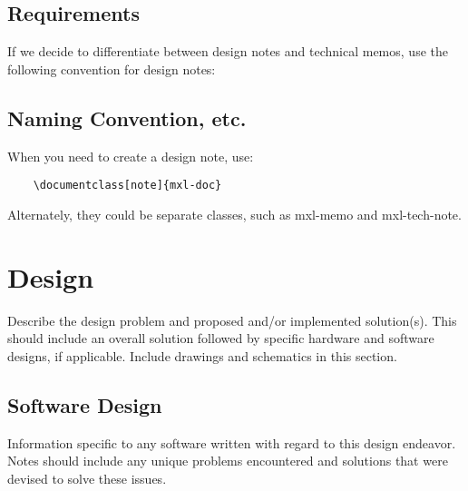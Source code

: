 \documentclass{mxl-design}
\begin{document}

\subsection{Requirements}
If we decide to differentiate between design notes and technical memos, use the following convention for design notes:

\subsection{Naming Convention, etc.}
When you need to create a design note, use:

\begin{verbatim}
	\documentclass[note]{mxl-doc}
\end{verbatim}

Alternately, they could be separate classes, such as mxl-memo and mxl-tech-note.

\section{Design}

Describe the design problem and proposed and/or implemented solution(s). This should include an overall solution followed by specific hardware and software designs, if applicable.  Include drawings and schematics in this section.

\subsection{Software Design}

Information specific to any software written with regard to this design endeavor.  Notes should include any unique problems encountered and solutions that were devised to solve these issues.

\end{document}
